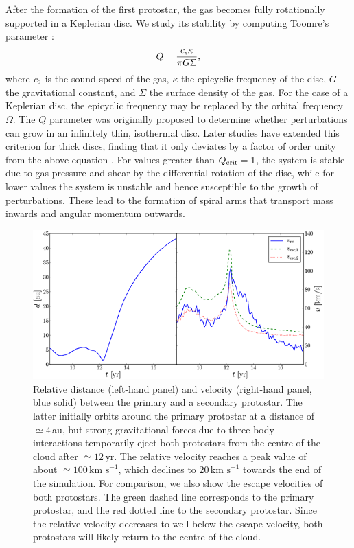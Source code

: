 \documentclass[useAMS,usenatbib]{mnras}
\newcommand{\kms}{\text{km~s}^{-1}}
\newcommand{\cs}{c_{\rm s}}
\begin{document}
After the formation of the first protostar, the gas becomes fully rotationally supported in a Keplerian disc. We study its stability by computing Toomre's parameter \citep{Toomre_64}:
\begin{equation}
Q = \frac{\cs \kappa}{\pi G \Sigma},
\label{eq:Q}
\end{equation}
where $\cs$ is the sound speed of the gas, $\kappa$ the epicyclic frequency of the disc, $G$ the gravitational constant, and $\Sigma$ the surface density of the gas. For the case of a Keplerian disc, the epicyclic frequency may be replaced by the orbital frequency $\Omega$. The $Q$ parameter was originally proposed to determine whether perturbations can grow in an infinitely thin, isothermal disc. Later studies have extended this criterion for thick discs, finding that it only deviates by a factor of order unity from the above equation \citep{Wang_2010}. For values greater than $Q_{\rm crit}=1$, the system is stable due to gas pressure and shear by the differential rotation of the disc, while for lower values the system is unstable and hence susceptible to the growth of perturbations. These lead to the formation of spiral arms that transport mass inwards and angular momentum outwards.

\begin{figure}
\begin{center}
\includegraphics[scale=1.0]{./f8.png}
\caption{Relative distance (left-hand panel) and velocity (right-hand panel, blue solid) between the primary and a secondary protostar. The latter initially orbits around the primary protostar at a distance of $\simeq 4\,$au, but strong gravitational forces due to three-body interactions temporarily eject both protostars from the centre of the cloud after $\simeq 12\,$yr. The relative velocity reaches a peak value of about $\simeq 100\,\kms$, which declines to $20\,\kms$ towards the end of the simulation. For comparison, we also show the escape velocities of both protostars. The green dashed line corresponds to the primary protostar, and the red dotted line to the secondary protostar. Since the relative velocity decreases to well below the escape velocity, both protostars will likely return to the centre of the cloud.}
\label{fig:dist_and_vel}
\end{center}
\end{figure}
\end{document}
